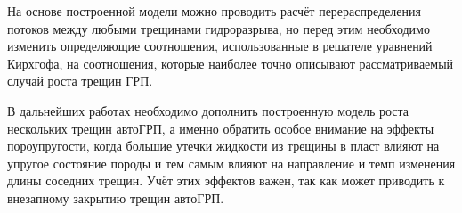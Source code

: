 \vspace*{3mm}

На основе построенной модели можно проводить расчёт перераспределения потоков между любыми трещинами гидроразрыва, но перед этим необходимо изменить определяющие соотношения, использованные в решателе уравнений Кирхгофа, на соотношения, которые наиболее точно описывают рассматриваемый случай роста трещин ГРП.

В дальнейших работах необходимо дополнить построенную модель роста нескольких трещин автоГРП, а именно обратить особое внимание на эффекты пороупругости, когда большие утечки жидкости из трещины в пласт влияют на упругое состояние породы и тем самым влияют на направление и темп изменения длины соседних трещин.
Учёт этих эффектов важен, так как может приводить к внезапному закрытию трещин автоГРП.





